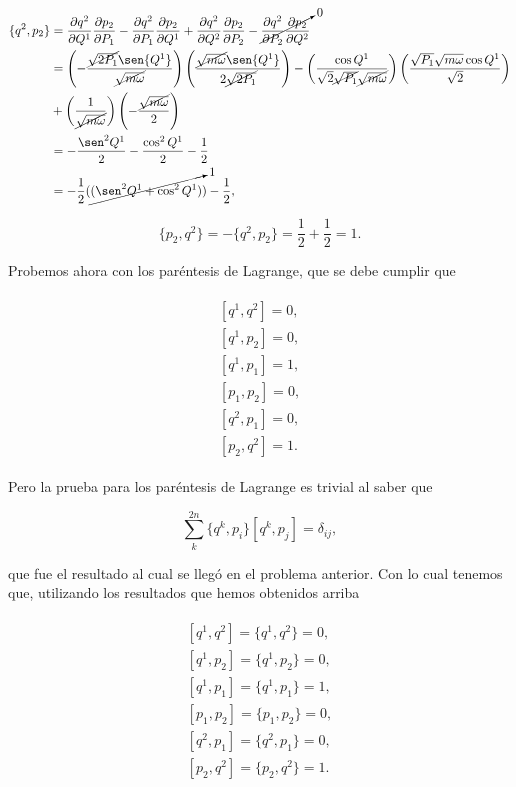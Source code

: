 \documentclass[a4paper,10pt]{article}
\numberwithin{equation}{section}
\begin{document}
\begin{align*}
 \{q^2, p_2\} &= \frac{\partial q^2}{\partial Q^1}\frac{\partial p_2}{\partial P_1} - 
 \frac{\partial q^2}{\partial P_1}\frac{\partial p_2}{\partial Q^1} + 
 \frac{\partial q^2}{\partial Q^2}\frac{\partial p_2}{\partial P_2} -
 \cancelto{0}{\frac{\partial q^2}{\partial P_2}\frac{\partial p_2}{\partial Q^2}} \\
 &=  \left(- \frac{\cancel{\sqrt{2P_1}}\sen{Q^1}}{\cancel{\sqrt{m\omega}}} \right)
 \left(\frac{\cancel{\sqrt{m\omega}}\sen{Q^1}}{2\cancel{\sqrt{2P_1}}} \right) - 
 \left(\frac{\cos{Q^1}}{\sqrt{2}\cancel{\sqrt{P_1}}\cancel{\sqrt{m\omega}}} \right)
 \left(\frac{\sqrt{P_1}\sqrt{m\omega}\cos{Q^1}}{\sqrt{2}} \right) \\
 &+ \left(\frac{1}{\cancel{\sqrt{m\omega}}}\right)\left(- \frac{\cancel{\sqrt{m\omega}}}{2} \right) \\
 &= - \frac{\sen^2{Q^1}}{2} - \frac{\cos^2{Q^1}}{2} - \frac{1}{2} \\
 &= - \frac{1}{2}(\cancelto{1}{(\sen^2{Q^1} + \cos^2{Q^1})}) - \frac{1}{2},
\end{align*}

\begin{equation}
 \{p_2, q^2\} = - \{q^2, p_2\} = \frac{1}{2} + \frac{1}{2} = 1.
\end{equation}

Probemos ahora con los paréntesis de Lagrange, que se debe cumplir que

\begin{align}
 \begin{split}
  [q^1,q^2] = 0, \\
  [q^1,p_2] = 0, \\
  [q^1,p_1] = 1, \\
  [p_1,p_2] = 0, \\
  [q^2,p_1] = 0, \\
  [p_2, q^2] = 1.
 \end{split}
\end{align}

Pero la prueba para los paréntesis de Lagrange es trivial al saber que 

\begin{equation}
 \sum_k^{2n} \{q^k,p_i\}[q^k,p_j] = \delta_{ij},
\end{equation}

que fue el resultado al cual se llegó en el problema anterior. Con lo cual tenemos que,
utilizando los resultados que hemos obtenidos arriba

\begin{align}
 \begin{split}
  [q^1,q^2] = \{q^1,q^2\} = 0, \\
  [q^1,p_2] = \{q^1,p_2\} = 0, \\
  [q^1,p_1] = \{q^1, p_1\} = 1, \\
  [p_1,p_2] = \{p_1,p_2\} = 0, \\
  [q^2,p_1] = \{q^2,p_1\} = 0, \\
  [p_2, q^2] = \{p_2,q^2\} = 1.
 \end{split}
\end{align}
\end{document}
